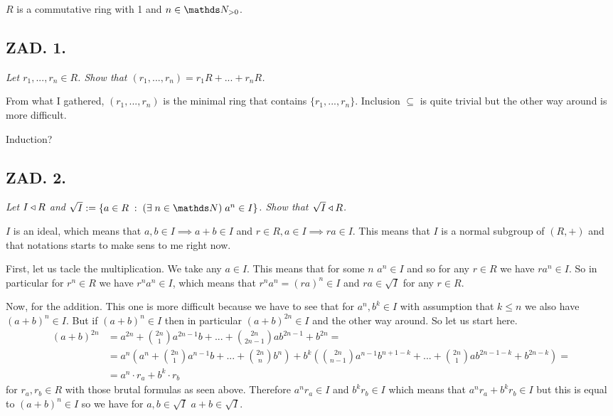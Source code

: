 \documentclass{article}[13pt]
\begin{document}
$R$ is a commutative ring with 1 and $n\in\N_{>0}$.

\subsection*{ZAD. 1.}
\emph{Let $r_1,...,r_n\in R$. Show that $(r_1,...,r_n)=r_1R+...+r_nR$.}
\medskip

\medskip

From what I gathered, $(r_1,...,r_n)$ is the minimal ring that contains $\{r_1,...,r_n\}$. Inclusion $\subseteq$ is quite trivial but the other way around is more difficult.

Induction?

\subsection*{ZAD. 2.}
\emph{Let $I\triangleleft R$ and $\sqrt{I}:=\{a\in R\;:\;(\exists\;n\in \N)\;a^n\in I\}$. Show that $\sqrt{I}\triangleleft R$.}
\medskip

\medskip

$I$ is an ideal, which means that $a,b\in I\implies a+b\in I$ and $r\in R,a\in I\implies ra\in I$. This means that $I$ is a normal subgroup of $(R, +)$ and that notations starts to make sens to me right now.
\smallskip

First, let us tacle the multiplication. We take any $a\in I$. This means that for some $n$ $a^n\in I$ and so for any $r\in R$ we have $ra^n\in I$. So in particular for $r^n\in R$ we have $r^na^n\in I$, which means that $r^na^n=(ra)^n\in I$ and $ra\in\sqrt{I}$ for any $r\in R$.
\smallskip

Now, for the addition. This one is more difficult because we have to see that for $a^n, b^k\in I$ with assumption that $k\leq n$ we also have $(a+b)^n\in I$. But if $(a+b)^n\in I$ then in particular $(a+b)^{2n}\in I$ and the other way around. So let us start here. 
\begin{align*}
    (a+b)^{2n}&=a^{2n}+{2n\choose 1}a^{2n-1}b+...+{2n\choose 2n-1}ab^{2n-1}+b^{2n}=\\
    &=a^n(a^n+{2n\choose 1}a^{n-1}b+...+{2n\choose n}b^n)+b^k({2n\choose n-1}a^{n-1}b^{n+1-k}+...+{2n\choose 1}ab^{2n-1-k}+b^{2n-k})=\\
    &=a^n\cdot r_a+b^k\cdot r_b
\end{align*}
for $r_a,r_b\in R$ with those brutal formulas as seen above. Therefore $a^nr_a\in I$ and $b^kr_b\in I$ which means that $a^nr_a+b^kr_b\in I$ but this is equal to $(a+b)^n\in I$ so we have for $a,b\in\sqrt{I}$ $a+b\in\sqrt{I}$.
\end{document}
